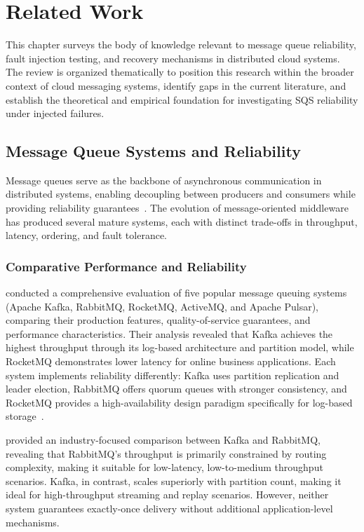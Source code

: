 \chapter{Related Work}

This chapter surveys the body of knowledge relevant to message queue reliability, fault injection testing, and recovery mechanisms in distributed cloud systems. The review is organized thematically to position this research within the broader context of cloud messaging systems, identify gaps in the current literature, and establish the theoretical and empirical foundation for investigating SQS reliability under injected failures.

\section{Message Queue Systems and Reliability}

Message queues serve as the backbone of asynchronous communication in distributed systems, enabling decoupling between producers and consumers while providing reliability guarantees~\citep{DiasDeAssuncao2020MQComparison}. The evolution of message-oriented middleware has produced several mature systems, each with distinct trade-offs in throughput, latency, ordering, and fault tolerance.

\subsection{Comparative Performance and Reliability}

\citet{DiasDeAssuncao2020MQComparison} conducted a comprehensive evaluation of five popular message queuing systems (Apache Kafka, RabbitMQ, RocketMQ, ActiveMQ, and Apache Pulsar), comparing their production features, quality-of-service guarantees, and performance characteristics. Their analysis revealed that Kafka achieves the highest throughput through its log-based architecture and partition model, while RocketMQ demonstrates lower latency for online business applications. Each system implements reliability differently: Kafka uses partition replication and leader election, RabbitMQ offers quorum queues with stronger consistency, and RocketMQ provides a high-availability design paradigm specifically for log-based storage~\citep{Ji2023RocketHA}.

\citet{Nagaraj2017KafkaVsRabbitMQ} provided an industry-focused comparison between Kafka and RabbitMQ, revealing that RabbitMQ's throughput is primarily constrained by routing complexity, making it suitable for low-latency, low-to-medium throughput scenarios. Kafka, in contrast, scales superiorly with partition count, making it ideal for high-throughput streaming and replay scenarios. However, neither system guarantees exactly-once delivery without additional application-level mechanisms.

